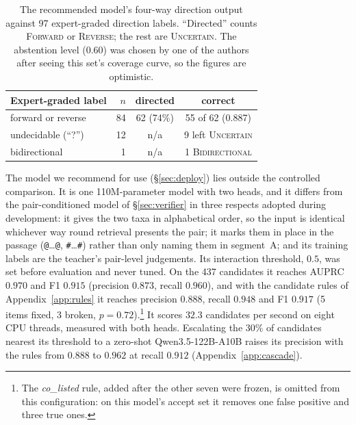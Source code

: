 \documentclass[11pt]{article}
\begin{document}
\begin{table}[t]\centering\small
\setlength{\tabcolsep}{3.6pt}
\begin{tabular}{lrcc}
\toprule
Expert-graded label & $n$ & directed & correct \\
\midrule
forward or reverse     & 84 & 62 (74\%) & 55 of 62 (0.887) \\
undecidable (``?'')    & 12 & n/a & 9 left \textsc{Uncertain} \\
bidirectional          &  1 & n/a & 1 \textsc{Bidirectional} \\
\bottomrule
\end{tabular}
\caption{The recommended model's four-way direction output against 97 expert-graded direction
labels. ``Directed'' counts \textsc{Forward} or \textsc{Reverse}; the rest are \textsc{Uncertain}.
The abstention level ($0.60$) was chosen by one of the authors after seeing this set's coverage curve, so
the figures are optimistic.}
\label{tab:direction}
\end{table}

The model we recommend for use (\S\ref{sec:deploy}) lies outside the controlled comparison. It is
one 110M-parameter model with two heads, and it differs from the pair-conditioned model of
\S\ref{sec:verifier} in three respects adopted during development: it gives the two taxa in
alphabetical order, so the input is identical whichever way round retrieval presents the pair; it
marks them in place in the passage (\texttt{@}\ldots\texttt{@}, \texttt{\#}\ldots\texttt{\#})
rather than only naming them in segment~A; and its training labels are the teacher's pair-level
judgements. Its interaction threshold, $0.5$, was set before evaluation and never tuned. On the 437
candidates it reaches AUPRC $0.970$ and F1 $0.915$ (precision $0.873$, recall $0.960$), and with the
candidate rules of Appendix~\ref{app:rules} it reaches precision $0.888$, recall $0.948$ and F1
$0.917$ (5 items fixed, 3 broken, $p = 0.72$).\footnote{The \emph{co\_listed} rule, added after the other seven were frozen, is omitted from
this configuration: on this model's accept set it removes one false positive and three
true ones.} It scores $32.3$ candidates per second on eight CPU threads, measured with both heads.
Escalating the 30\% of candidates nearest its threshold to a zero-shot Qwen3.5-122B-A10B raises its
precision with the rules from $0.888$ to $0.962$ at recall $0.912$ (Appendix~\ref{app:cascade}).
\end{document}
